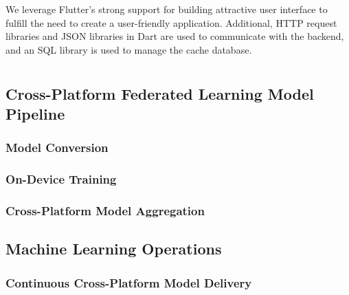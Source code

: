 We leverage Flutter's strong support for
building attractive user interface to fulfill the need to
create a user-friendly application.
Additional, HTTP request libraries and JSON libraries in Dart are used to
communicate with the backend,
and an SQL library is used to manage the cache database.

\section{\fedkit}

\subsection{Cross-Platform Federated Learning Model Pipeline}

\subsubsection{Model Conversion}

\subsubsection{On-Device Training}

\subsubsection{Cross-Platform Model Aggregation}

\subsection{Machine Learning Operations}

\subsubsection{Continuous Cross-Platform Model Delivery}
